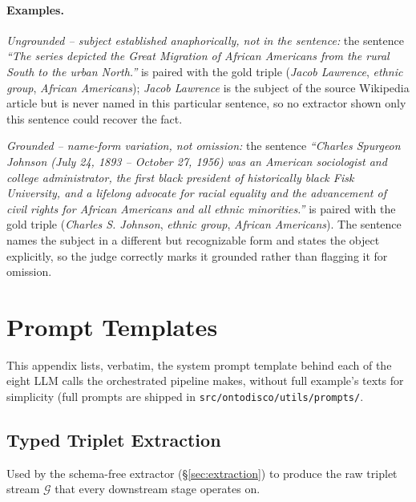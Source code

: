 \documentclass[11pt]{article}
\begin{document}
\paragraph{Examples.} \emph{Ungrounded -- subject established anaphorically, not in the sentence:} the sentence \emph{``The series depicted the Great Migration of African Americans from the rural South to the urban North.''} is paired with the gold triple (\emph{Jacob Lawrence}, \emph{ethnic group}, \emph{African Americans}); \emph{Jacob Lawrence} is the subject of the source Wikipedia article but is never named in this particular sentence, so no extractor shown only this sentence could recover the fact.

\emph{Grounded -- name-form variation, not omission:} the sentence \emph{``Charles Spurgeon Johnson (July 24, 1893 -- October 27, 1956) was an American sociologist and college administrator, the first black president of historically black Fisk University, and a lifelong advocate for racial equality and the advancement of civil rights for African Americans and all ethnic minorities.''} is paired with the gold triple (\emph{Charles S. Johnson}, \emph{ethnic group}, \emph{African Americans}). The sentence names the subject in a different but recognizable form and states the object explicitly, so the judge correctly marks it grounded rather than flagging it for omission.

\section{Prompt Templates}
\label{sec:appendix-prompts}

This appendix lists, verbatim, the system prompt template behind each of
the eight LLM calls the orchestrated pipeline makes, without full example's texts for simplicity (full prompts are shipped in
\texttt{src/ontodisco/utils/prompts/}.

\subsection{Typed Triplet Extraction}
\label{sec:appendix-extraction}
Used by the schema-free extractor (\S\ref{sec:extraction}) to produce the raw triplet stream $\mathcal{G}$ that every downstream stage operates on.
\end{document}
